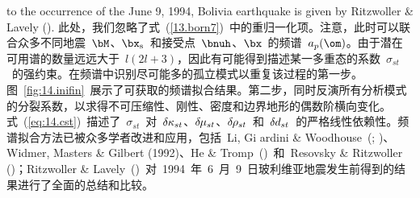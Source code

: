 to the occurrence of the June 9, 1994, Bolivia earthquake is
given by Ritzwoller \& Lavely (\citeyear{ritzwoller&lavely95}).
\fi
此处，我们忽略了式~(\ref{13.born7})~中的重归一化项。注意，此时可以联合众多不同地震~$\bM$、$\bx_{\rm s}$~和接受点~$\bnuh$、$\bx$~的频谱~$a_p(\om)$。由于潜在可用谱的数量远远大于~$l(2l+3)$，因此有可能得到描述某一多重态的系数~$\sigma_{st}$~的强约束。在频谱中识别尽可能多的孤立模式以重复该过程的第一步。图~\ref{fig:14.inifin}~展示了可获取的频谱拟合结果。第二步，同时反演所有分析模式的分裂系数，以求得不可压缩性、刚性、密度和边界地形的偶数阶横向变化。式~(\ref{eq:14.cst})~描述了~$\sigma_{st}$~对~$\delta\hspace{-0.1 mm}\kappa_{st}$、$\delta\hspace{-0.2 mm}\mu_{st}$、$\delta\hspace{-0.2 mm}\rho_{st}$~和~$\delta\hspace{-0.1 mm}d_{st}$~的严格线性依赖性。频谱拟合方法已被众多学者改进和应用，包括~Li, Gi ardini \& Woodhouse~(\citeyear{li&al91}; \citeyear{li&al91b})、Widmer, Masters \& Gilbert (1992)、He \& Tromp~(\citeyear{he&tromp96})~和~Resovsky \& Ritzwoller (\citeyear{resovsky&ritzwoller98})；Ritzwoller \& Lavely~(\citeyear{ritzwoller&lavely95})~对~1994~年~6~月~9~日玻利维亚地震发生前得到的结果进行了全面的总结和比较。

